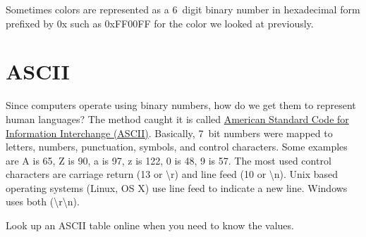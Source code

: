 Sometimes colors are represented as a 6~digit binary number in hexadecimal form prefixed by 0x such 
as 0xFF00FF for the color we looked at previously. 

\section{ASCII}
Since computers operate using binary numbers, how do we get them to represent human languages? The method 
caught it is called \href{https://en.wikipedia.org/wiki/ASCII}{American Standard Code for Information Interchange (ASCII)}. Basically, 7~bit numbers
were mapped to letters, numbers, punctuation, symbols, and control characters. Some examples are A is 65, Z 
is 90, a is 97, z is 122, 0 is 48, 9 is 57. The most used control characters are carriage return (13 or \textbackslash r) and 
line feed (10 or \textbackslash n). Unix based operating systems (Linux, OS X) use line feed to indicate a new line. Windows
uses both (\textbackslash r\textbackslash n).

Look up an ASCII table online when you need to know the values.
